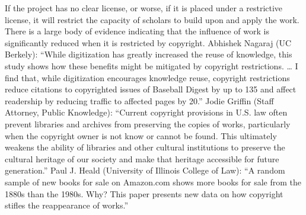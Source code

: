 {}If the project has no clear license, or worse, if it is placed under a restrictive license, it will restrict the capacity of scholars to build upon and apply the work. There is a large body of evidence indicating that the influence of work is significantly reduced when it is restricted by copyright.\markdownRendererInterblockSeparator
{}Abhishek Nagaraj (UC Berkely): \markdownRendererInterblockSeparator
{}\markdownRendererBlockQuoteBegin
“While digitization has greatly increased the reuse of knowledge, this study shows how these benefits might be mitigated by copyright restrictions. … I find that, while digitization encourages knowledge reuse, copyright restrictions reduce citations to copyrighted issues of Baseball Digest by up to 135\markdownRendererPercentSign{} and affect readership by reducing traffic to affected pages by 20\markdownRendererPercentSign{}.”
\markdownRendererBlockQuoteEnd \markdownRendererInterblockSeparator
{}Jodie Griffin (Staff Attorney, Public Knowledge): \markdownRendererInterblockSeparator
{}\markdownRendererBlockQuoteBegin
“Current copyright provisions in U.S. law often prevent libraries and archives from preserving the copies of works, particularly when the copyright owner is not know or cannot be found. This ultimately weakens the ability of libraries and other cultural institutions to preserve the cultural heritage of our society and make that heritage accessible for future generation.”
\markdownRendererBlockQuoteEnd \markdownRendererInterblockSeparator
{}Paul J. Heald (University of Illinois College of Law): \markdownRendererInterblockSeparator
{}\markdownRendererBlockQuoteBegin
“A random sample of new books for sale on Amazon.com shows more books for sale from the 1880s than the 1980s. Why? This paper presents new data on how copyright stifles the reappearance of works.”
